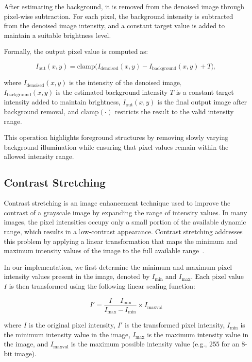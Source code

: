 After estimating the background, it is removed from the denoised image through 
pixel-wise subtraction. For each pixel, the background intensity is subtracted 
from the denoised image intensity, and a constant target value is added to 
maintain a suitable brightness level.

Formally, the output pixel value is computed as:

\[
I_{\text{out}}(x,y) =
\mathrm{clamp}\big(
I_{\text{denoised}}(x,y)
-
I_{\text{background}}(x,y)
+
T
\big),
\]

where $I_{\text{denoised}}(x,y)$ is the intensity of the denoised image,\\
$I_{\text{background}}(x,y)$ is the estimated background intensity
$T$ is a constant target intensity added to maintain brightness,
$I_{\text{out}}(x,y)$ is the final output image after background removal,
and $\mathrm{clamp}(\cdot)$ restricts the result to the valid intensity range.

This operation highlights foreground structures by removing slowly varying 
background illumination while ensuring that pixel values remain within the 
allowed intensity range.

\subsection{Contrast Stretching}


Contrast stretching is an image enhancement technique used to improve the contrast of a grayscale image by expanding the range of intensity values. In many images, the pixel intensities occupy only a small portion of the available dynamic range, which results in a low-contrast appearance. Contrast stretching addresses this problem by applying a linear transformation that maps the minimum and maximum intensity values of the image to the full available range~\cite{Gonzalez2008Digital}.

In our implementation, we first determine the minimum and maximum pixel intensity values present in the image, denoted by $I_{\min}$ and $I_{\max}$. Each pixel value $I$ is then transformed using the following linear scaling function:

\[
I' = \frac{I - I_{\min}}{I_{\max} - I_{\min}} \times I_{\text{maxval}}
\]

where $I$ is the original pixel intensity, $I'$ is the transformed pixel intensity, $I_{\min}$ is the minimum intensity value in the image, $I_{\max}$ is the maximum intensity value in the image, and $I_{\text{maxval}}$ is the maximum possible intensity value (e.g., 255 for an 8-bit image).

